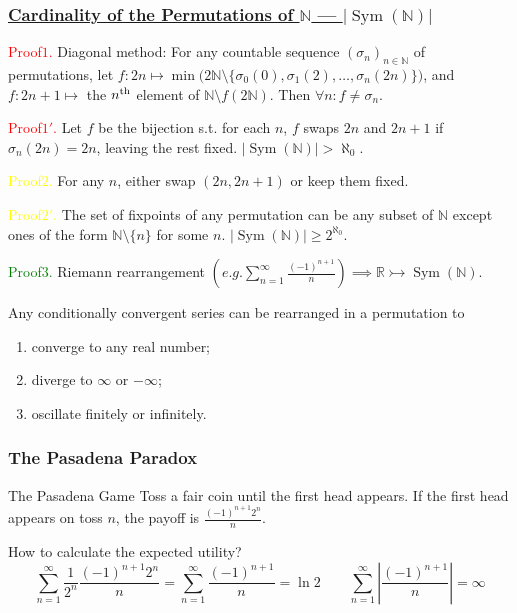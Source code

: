 \documentclass[UTF8,aspectratio=43,11pt,colorlinks,compress,openany]{beamer}%
\begin{document}
\begin{frame}\frametitle{\href{https://mathoverflow.net/questions/29475/an-easy-proof-of-the-uncountability-of-bijections-on-natural-numbers}{Cardinality of the Permutations of $\mathbb{N}$ --- $|\operatorname{Sym}(\mathbb{N})|$}}
	\textcolor{red}{Proof$1$.} Diagonal method: For any countable sequence $(\sigma_n)_{n\in\mathbb{N}}$ of permutations, let $f: 2n\mapsto \min\big(2\mathbb{N}\setminus\{\sigma_0(0),\sigma_1(2),\dots,\sigma_n(2n)\}\big)$, and $f: 2n+1\mapsto$ the $n\textsuperscript{th}$ element of $\mathbb{N}\setminus f(2\mathbb{N})$. Then $\forall n: f\ne\sigma_n$.
	
	\textcolor{red}{Proof$1'$.} Let $f$ be the bijection s.t. for each $n$, $f$ swaps $2n$ and $2n+1$ if $\sigma_n(2n)=2n$, leaving the rest fixed. $|\operatorname{Sym}(\mathbb{N})|>\aleph_0$.
	
	\textcolor{yellow}{Proof$2$.} For any $n$, either swap $(2n,2n+1)$ or keep them fixed.
	
	\textcolor{yellow}{Proof$2'$.} The set of fixpoints of any permutation can be any subset of $\mathbb{N}$ except ones of the form $\mathbb{N}\setminus\{n\}$ for some $n$. $|\operatorname{Sym}(\mathbb{N})|\geq 2^{\aleph_0}$.
	
	\textcolor{green}{Proof$3$.} Riemann rearrangement $\left(e.g. \sum\limits_{n=1}^\infty\frac{(-1)^{n+1}}{n}\right)\implies\mathbb{R}\rightarrowtail\operatorname{Sym}(\mathbb{N})$.

	\begin{theorem}
		Any conditionally convergent series can be rearranged in a permutation to
		\begin{enumerate}
			\item converge to any real number;
			\item diverge to $\infty$ or $-\infty$;
			\item oscillate finitely or infinitely.
		\end{enumerate}
	\end{theorem}
\vspace*{-12ex}
\end{frame}

\begin{frame}\frametitle{The Pasadena Paradox}
\begin{block}{The Pasadena Game}
Toss a fair coin until the first head appears. If the first head appears on toss $n$, the payoff is $\frac{(-1)^{n+1}2^n}{n}$.
\end{block}
How to calculate the expected utility?
\[\sum\limits_{n=1}^\infty\frac{1}{2^n}\frac{(-1)^{n+1}2^n}{n}=\sum\limits_{n=1}^\infty\frac{(-1)^{n+1}}{n}=\ln 2\qquad \sum\limits_{n=1}^\infty\left|\frac{(-1)^{n+1}}{n}\right|=\infty\]
\end{frame}
\end{document}
